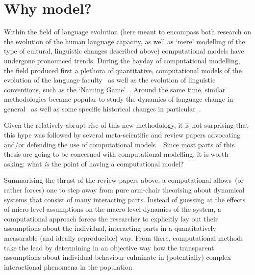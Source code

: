 \section{Why model?}

Within the field of language evolution (here meant to encompass both research on the evolution of the human language capacity, as well as `mere' modelling of the type of cultural, linguistic changes described above) computational models have undergone pronounced trends. %
During the hayday of computational modelling, the field produced first a plethora of quantitative, computational models of the evolution of the language faculty~\citep{Kirby1999,Nowak2001a} as well as the evolution of linguistic conventions, such as the `Naming Game'~\citep[see \citet{Wellens2012} for a review]{Baronchelli2008}. Around the same time, similar methodologies became popular to study the dynamics of language change in general~\citep{Niyogi1995,Niyogi1997,Livingstone2000,Wedel2006,Baxter2006,Wedel2007,Fagyal2010,Blythe2012,Gong2012,Pierrehumbert2014} as well as some specific historical changes in particular~\citep{Baxter2009,Sonderegger2010,Swarup2012,Kirby2013,Kirby2013cogsci}. %


Given the relatively abrupt rise of this new methodology, it is not surprising that this hype was followed by several meta-scientific and review papers advocating and/or defending the use of computational models~\citep{DeBoer2006,Baker2008,Jaeger2009,Hruschka2009,Vogt2010,DeBoer2012EvoLang}. Since most parts of this thesis are going to be concerned with computational modelling, it is worth asking: what \emph{is} the point of having a computational model?

Summarising the thrust of the review papers above, a computational allows~(or rather forces) one to step away from pure arm-chair theorising about dynamical systems that consist of many interacting parts. Instead of guessing at the effects of micro-level assumptions on the macro-level dynamics of the system, a computational approach forces the researcher to explicitly lay out their assumptions about the individual, interacting parts in a quantitatively measurable (and ideally reproducible) way. From there, computational methods take the lead by determining in an objective way how the transparent assumptions about individual behaviour culminate in (potentially) complex interactional phenomena in the population.

